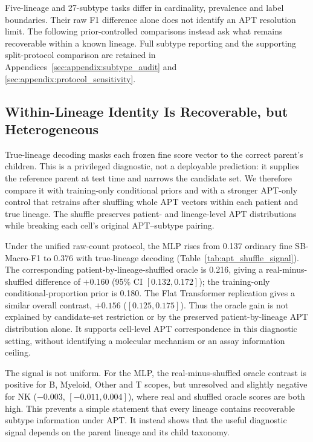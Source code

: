 Five-lineage and 27-subtype tasks differ in cardinality, prevalence and label
boundaries. Their raw F1 difference alone does not identify an APT resolution
limit. The following prior-controlled comparisons instead ask what remains
recoverable within a known lineage. Full subtype reporting and the supporting
split-protocol comparison are retained in
Appendices~\ref{sec:appendix:subtype_audit} and
\ref{sec:appendix:protocol_sensitivity}.

\subsection{Within-Lineage Identity Is Recoverable, but Heterogeneous}
\label{sec:results:within_lineage}

True-lineage decoding masks each frozen fine score vector to the correct
parent's children. This is a privileged diagnostic, not a deployable prediction:
it supplies the reference parent at test time and narrows the candidate set.
We therefore compare it with training-only conditional priors and with a
stronger APT-only control that retrains after shuffling whole APT vectors within
each patient and true lineage. The shuffle preserves patient- and lineage-level
APT distributions while breaking each cell's original APT--subtype pairing.

Under the unified raw-count protocol, the MLP rises from 0.137 ordinary fine
SB-Macro-F1 to 0.376 with true-lineage decoding (Table~\ref{tab:apt_shuffle_signal}).
The corresponding patient-by-lineage-shuffled oracle is 0.216, giving a
real-minus-shuffled difference of $+0.160$ (95\% CI $[0.132,0.172]$);
the training-only conditional-proportion prior is 0.180. The Flat Transformer
replication gives a similar overall contrast, $+0.156$ ($[0.125,0.175]$).
Thus the oracle gain is not explained by candidate-set restriction or by the
preserved patient-by-lineage APT distribution alone. It supports cell-level
APT correspondence in this diagnostic setting, without identifying a molecular
mechanism or an assay information ceiling.



The signal is not uniform. For the MLP, the real-minus-shuffled oracle contrast
is positive for B, Myeloid, Other and T scopes, but unresolved and slightly
negative for NK ($-0.003$, $[-0.011,0.004]$), where real and shuffled oracle
scores are both high. This prevents a simple statement that every lineage
contains recoverable subtype information under APT. It instead shows that the
useful diagnostic signal depends on the parent lineage and its child taxonomy.

